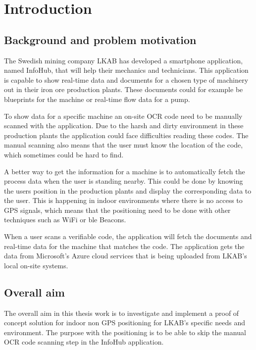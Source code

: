 \chapter{Introduction}\label{sec:intro} 

\section{Background and problem motivation}\label{sec:introBackground}
The Swedish mining company LKAB has developed a smartphone application, named InfoHub, that will help their mechanics and technicians.
This application is capable to show real-time data and documents for a chosen type of machinery out in their iron ore production plants.
These documents could for example be blueprints for the machine or real-time flow data for a pump.

\bigskip

To show data for a specific machine an on-site OCR code need to be manually scanned with the application.
Due to the harsh and dirty environment in these production plants the application could face difficulties reading these codes.
The manual scanning also means that the user must know the location of the code, which sometimes could be hard to find.

\bigskip

A better way to get the information for a machine is to automatically fetch the process data when the user is standing nearby. 
This could be done by knowing the users position in the production plants and display the corresponding data to the user.
This is happening in indoor environments where there is no access to GPS signals, which means that the positioning need to be done with other techniques such as WiFi or \acrlong{ble} Beacons.

\bigskip

When a user scans a verifiable code, the application will fetch the documents and real-time data for the machine that matches the code.
The application gets the data from Microsoft’s Azure cloud services that is being uploaded from LKAB’s local on-site systems.

\section{Overall aim}\label{sec:introOverallAim}
The overall aim in this thesis work is to investigate and implement a proof of concept solution for indoor non GPS positioning for LKAB's specific needs and environment.
The purpose with the positioning is to be able to skip the manual OCR code scanning step in the InfoHub application.


